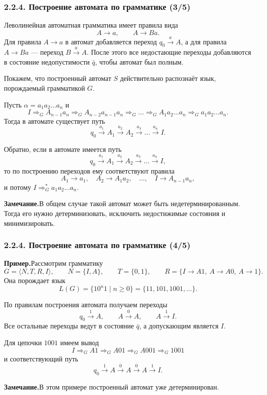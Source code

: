 \documentclass[mathserif,12pt,aspectratio=169]{beamer}
\let\ge\geqslant
\def\remark{\par{\bf \color{brown} Замечание.}}
\def\example{\par{\bf \color{brown} Пример.}}
\begin{document}
\begin{frame}
\frametitle{2.2.4. Построение автомата по грамматике (3/5)}
\small
Леволинейная автоматная грамматика имеет правила вида
\[
A\to a,
\qquad
A\to Ba.
\]
Для правила \(A\to a\) в автомат добавляется переход \(q_0\xrightarrow{a}A\),
а для правила \(A\to Ba\) --- переход \(B\xrightarrow{a}A\).
После этого все недостающие переходы добавляются в состояние
недопустимости \(\bar q\), чтобы автомат был полным.

\smallskip
Покажем, что построенный автомат \(S\) действительно распознаёт язык,
порождаемый грамматикой \(G\).

Пусть \(\alpha=a_1a_2\dots a_n\) и
\[
I \Rightarrow_G A_{n-1}a_n
\Rightarrow_G A_{n-2}a_{n-1}a_n
\Rightarrow_G \dots
\Rightarrow_G A_1a_2\dots a_n
\Rightarrow_G a_1a_2\dots a_n.
\]
Тогда в автомате существует путь
\[
q_0\xrightarrow{a_1}A_1\xrightarrow{a_2}A_2\xrightarrow{a_3}\dots\xrightarrow{a_n}I.
\]

Обратно, если в автомате имеется путь
\[
q_0\xrightarrow{a_1}A_1\xrightarrow{a_2}A_2\xrightarrow{a_3}\dots\xrightarrow{a_n}I,
\]
то по построению переходов ему соответствуют правила
\[
A_1\to a_1,\quad A_2\to A_1a_2,\quad \dots,\quad I\to A_{n-1}a_n,
\]
и потому \(I\Rightarrow_G^* a_1a_2\dots a_n\).

\remark В общем случае такой автомат может быть недетерминированным. Тогда его нужно
детерминизовать, исключить недостижимые состояния и минимизировать.

\end{frame}

\begin{frame}
\frametitle{2.2.4. Построение автомата по грамматике (4/5)}
\small
\example Рассмотрим грамматику
\[
G=\langle N,T,R,I\rangle,
\qquad
N=\{I,A\},
\qquad
T=\{0,1\},
\qquad
R=\{I\to A1,\ A\to A0,\ A\to 1\}.
\]
Она порождает язык
\[
L(G)=\{10^n1\mid n\ge 0\}=\{11,101,1001,\dots\}.
\]

По правилам построения автомата получаем переходы
\[
q_0\xrightarrow{1}A,
\qquad
A\xrightarrow{0}A,
\qquad
A\xrightarrow{1}I.
\]
Все остальные переходы ведут в состояние \(\bar q\), а допускающим является \(I\).

Для цепочки \(1001\) имеем вывод
\[
I\Rightarrow_G A1\Rightarrow_G A01\Rightarrow_G A001\Rightarrow_G 1001
\]
и соответствующий путь
\[
q_0\xrightarrow{1}A\xrightarrow{0}A\xrightarrow{0}A\xrightarrow{1}I.
\]

\remark В этом примере построенный автомат уже детерминирован.

\end{frame}
\end{document}
